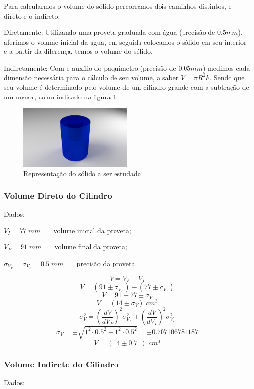 \documentclass{article}
\begin{document}
Para calcularmos o volume do sólido percorremos dois caminhos distintos, o direto e o indireto:

Diretamente: Utilizando uma proveta graduada com água (precisão de $0.5mm$), aferimos o volume inicial da água, em seguida colocamos o sólido em seu interior e a partir da diferença, temos o volume do sólido.

Indiretamente: Com o auxílio do paquímetro (precisão de $0.05mm$) medimos cada dimensão necessária para o cálculo de seu volume, a saber $V = \pi R^2 h$. Sendo que seu volume é determinado pelo volume de um cilindro grande com a subtração de um menor, como indicado na figura 1.

\begin{figure}[h]
    \centering
    \includegraphics[width=0.5\textwidth]{a0002.png}
    \caption{Representação do sólido a ser estudado}
    \label{fig:solido}
\end{figure}


\subsubsection{Volume Direto do Cilindro}
Dados:

$V_I = 77\;mm\; =$ volume inicial da proveta;

$V_F = 91\;mm\; =$ volume final da proveta;

$\sigma_{V_F} = \sigma_{V_I} = 0.5\;mm\;=$ precisão da proveta.

\[V = V_F - V_I\]
\[V = (91 \pm \sigma_{V_F})-(77 \pm \sigma_{V_I})\]
\[V = 91-77\pm\sigma_{V}\]
\[V= (14 \pm\sigma_{V})\; cm^3\]
\[\sigma_{V}^2 = \left(\frac{dV}{dV_F}\right)^2\sigma_{V_F}^2+\left(\frac{dV}{dV_I}\right)^2\sigma_{V_I}^2\]
\[\sigma_{V} = \pm\sqrt{1^2\cdot0.5^2+1^2\cdot0.5^2}=\pm0.707106781187\]
\[V= (14 \pm0.71)\; cm^3\]


\subsubsection{Volume Indireto do Cilindro}
Dados:
\end{document}
